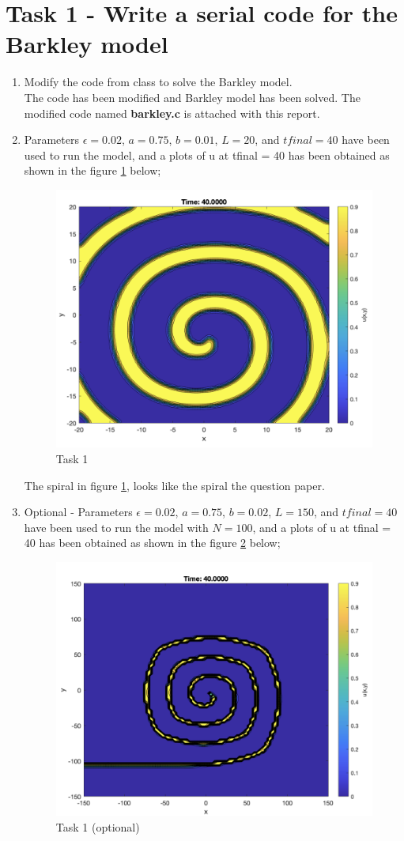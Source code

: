 \documentclass[12pt,a4paper]{article}
\begin{document}
\section*{Task 1 - Write a serial code for the Barkley model}
\begin{enumerate}
	\item Modify the code from class to solve the Barkley model. \\ 
	
	\noindent The code has been modified and Barkley model has been solved. The modified code  named \textbf{barkley.c}  is attached with this report. 
	
	\item Parameters $\epsilon = 0.02$, $a = 0.75$, $b = 0.01$, $L = 20$, and $tfinal = 40$ have been used to run the model, and a plots of u at tfinal = 40 has been obtained as shown in the figure \ref{fig:Task1} below;
	
	\begin{figure}[h]
		\centering
		\includegraphics[width=0.5\linewidth]{"Screenshot 2021-03-16 at 6.23.03 PM"}
		\caption{Task 1}
		\label{fig:Task1}
	\end{figure}
	
	The spiral in figure \ref{fig:Task1}, looks like the spiral the question paper.
	
	\item Optional - Parameters $\epsilon = 0.02$, $a = 0.75$, $b = 0.02$, $L = 150$, and $tfinal = 40$ have been used to run the model with $N = 100$, and a plots of u at tfinal = 40 has been obtained as shown in the figure \ref{fig:optional} below;
	
	\begin{figure}[H] 
		\centering
		\includegraphics[width=0.5\linewidth]{"Screenshot 2021-03-16 at 6.38.00 PM"}
		\caption{Task 1 (optional)}
		\label{fig:optional}
	\end{figure}
	
\end{enumerate}
\end{document}
